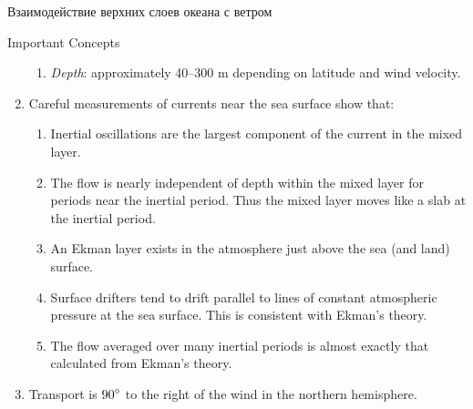 \begin{chapter}{Взаимодействие верхних слоев океана с ветром}
\begin{section}{Important Concepts}
\begin{enumerate}
\begin{enumerate}
\item 
\textit{Depth}: approximately 40--300 m depending on latitude
and wind velocity.
%
\end{enumerate}

\item 
Careful measurements of currents near the sea surface show that:
%
%
  \begin{enumerate}
   \item 
    Inertial oscillations are the largest component of the current in
    the mixed layer.
%

   \item The flow is nearly independent of depth within the mixed
    layer for periods near the
    inertial period. Thus the mixed layer moves
    like a slab at the inertial period.
%

   \item An Ekman layer exists in the atmosphere just above the sea
    (and land) surface.
%

   \item Surface drifters tend to drift parallel to
    lines of constant atmospheric pressure at the sea surface. This is
    consistent with Ekman's theory.
%

   \item The flow averaged over many inertial periods is almost
    exactly that calculated from Ekman's theory.
%
\end{enumerate}

\item 
Transport is ${90}^\circ$ to the right of the wind in the northern
hemisphere.
%


\end{enumerate}
\end{section}
\end{chapter}
